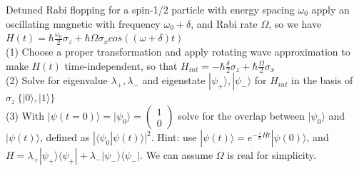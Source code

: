 \documentclass[UTF8,12pt]{article} %
\begin{document}
\begin{exercise}{}{}
Detuned Rabi flopping for a spin-1/2 particle with energy spacing $\omega_0$ apply an oscillating magnetic with frequency $\omega_0+\delta$, and Rabi rate $\Omega$, so we have $H(t) = \hbar\frac{\omega_0}{2}\sigma_{z} + \hbar\Omega\sigma_{x}cos((\omega+\delta)t)$\\
(1) Choose a proper transformation and apply rotating wave approximation to make $H(t)$ time-independent, so that $H_{int}=-\hbar\frac{\delta}{2}\sigma_z+\hbar\frac{\Omega}{2}\sigma_x$\\
(2) Solve for eigenvalue $\lambda_+,\lambda_-$ and eigenstate $|\psi_+\rangle,|\psi_-\rangle$ for $H_{int}$ in the basis of $\sigma_z~\{|0\rangle,|1\rangle\}$\\
(3) With $|\psi(t=0)\rangle=|\psi_0\rangle=\begin{pmatrix} 1 \\0 \end{pmatrix}$ solve for the overlap between $|\psi_0\rangle$ and $|\psi(t)\rangle$, defined as $|\langle\psi_0|\psi(t)\rangle|^2$. Hint: use $|\psi(t)\rangle=e^{-\frac{i}{\hbar}Ht}|\psi(0)\rangle$, and $H=\lambda_+|\psi_+\rangle\langle\psi_+|+\lambda_-|\psi_-\rangle\langle\psi_-|$. We can assume $\Omega$ is real for simplicity.
\end{exercise}
\end{document}
